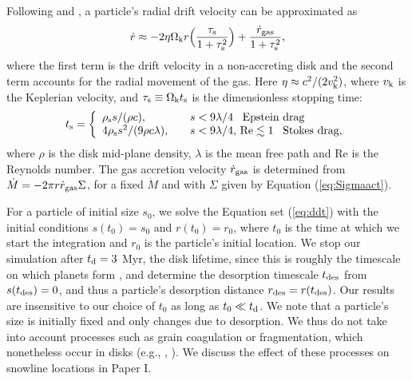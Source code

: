 \documentclass[apj]{emulateapj}
\begin{document}
Following \citet{chiang10} and \citet{birnstiel12}, a particle's radial drift velocity can be approximated as 
\begin{equation}
\label{eq:rdotact}
\dot{r} \approx -2 \eta \Omega_{\rm k} r \Big(\frac{\tau_{\rm s}}{1+\tau_{\rm s}^2}\Big) + \frac{\dot{r}_{\rm gas}}{1+\tau_{\rm s}^2},
\end{equation}
where the first term is the drift velocity in a non-accreting disk and the second term accounts for the radial movement of the gas. Here $\eta \approx c^2/(2 v_{\rm k}^2)$, where $v_{\rm k}$ is the Keplerian velocity, and $\tau_{\rm s} \equiv \Omega_{\rm k} t_{\rm s}$ is the dimensionless stopping time:
\begin{equation}
\label{eq:ts}
t_{\rm s}= \left\{
\begin{array}{l l}
\rho_{\rm s} s / (\rho c), & \quad s < 9 \lambda/4 \,\,\,\ \text{Epstein drag} \\
4 \rho_{\rm s} s^2 / (9 \rho c \lambda), & \quad s < 9 \lambda/4, \,\text{Re} \lesssim 1 \,\,\,\ \text{Stokes drag,}
\end{array} 
\right.
\end{equation}
where $\rho$ is the disk mid-plane density, $\lambda$ is the mean free path and Re is the Reynolds number.  The gas accretion velocity $\dot{r}_{\rm gas}$ is determined from $\dot{M}=-2 \pi r \dot{r}_{\rm gas} \Sigma$, for a fixed $\dot{M}$ and with $\Sigma$ given by Equation (\ref{eq:Sigmaact}). 

For a particle of initial size $s_0$, we solve the Equation set (\ref{eq:ddt}) with the initial conditions $s(t_0)=s_0$ and $r(t_0)=r_0$, where $t_0$ is the time at which we start the integration and $r_0$ is the particle's initial location. We stop our simulation after $t_{\rm d}=3$ Myr, the disk lifetime, since this is roughly the timescale on which planets form \citep{}, and determine the desorption timescale $t_{\rm des}$ from $s(t_{\rm des})=0$, and thus a particle's desorption distance $r_{\rm des}=r(t_{\rm des})$. Our results are insensitive to our choice of $t_0$ as long as $t_0 \ll t_{\rm d}$. We note that a particle's size is initially fixed and only changes due to desorption. We thus do not take into account processes such as grain coagulation or fragmentation, which nonetheless occur in disks (e.g., \citealt{birnstiel12}, \citealt{perez12}). We discuss the effect of these processes on snowline locations in Paper I.
\end{document}
